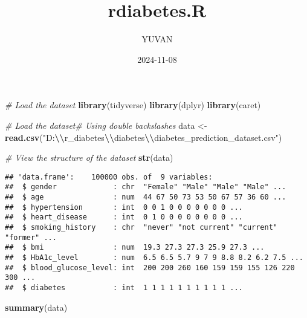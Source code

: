 \documentclass[
]{article}
\title{rdiabetes.R}
\author{YUVAN}
\date{2024-11-08}
\newenvironment{Shaded}{\begin{snugshade}}{\end{snugshade}}
\newcommand{\CommentTok}[1]{\textcolor[rgb]{0.56,0.35,0.01}{\textit{#1}}}
\newcommand{\FunctionTok}[1]{\textcolor[rgb]{0.13,0.29,0.53}{\textbf{#1}}}
\newcommand{\NormalTok}[1]{#1}
\newcommand{\OtherTok}[1]{\textcolor[rgb]{0.56,0.35,0.01}{#1}}
\newcommand{\SpecialCharTok}[1]{\textcolor[rgb]{0.81,0.36,0.00}{\textbf{#1}}}
\newcommand{\StringTok}[1]{\textcolor[rgb]{0.31,0.60,0.02}{#1}}
\begin{document}
\maketitle

\begin{Shaded}
\begin{Highlighting}[]
\CommentTok{\# Load the dataset}
\FunctionTok{library}\NormalTok{(tidyverse)}
\FunctionTok{library}\NormalTok{(dplyr)}
\FunctionTok{library}\NormalTok{(caret)}

\CommentTok{\# Load the dataset\# Using double backslashes}
\NormalTok{data }\OtherTok{\textless{}{-}} \FunctionTok{read.csv}\NormalTok{(}\StringTok{"D:}\SpecialCharTok{\textbackslash{}\textbackslash{}}\StringTok{r\_diabetes}\SpecialCharTok{\textbackslash{}\textbackslash{}}\StringTok{diabetes}\SpecialCharTok{\textbackslash{}\textbackslash{}}\StringTok{diabetes\_prediction\_dataset.csv"}\NormalTok{)}

\CommentTok{\# View the structure of the dataset}
\FunctionTok{str}\NormalTok{(data)}
\end{Highlighting}
\end{Shaded}

\begin{verbatim}
## 'data.frame':    100000 obs. of  9 variables:
##  $ gender             : chr  "Female" "Male" "Male" "Male" ...
##  $ age                : num  44 67 50 73 53 50 67 57 36 60 ...
##  $ hypertension       : int  0 0 1 0 0 0 0 0 0 0 ...
##  $ heart_disease      : int  0 1 0 0 0 0 0 0 0 0 ...
##  $ smoking_history    : chr  "never" "not current" "current" "former" ...
##  $ bmi                : num  19.3 27.3 27.3 25.9 27.3 ...
##  $ HbA1c_level        : num  6.5 6.5 5.7 9 7 9 8.8 8.2 6.2 7.5 ...
##  $ blood_glucose_level: int  200 200 260 160 159 159 155 126 220 300 ...
##  $ diabetes           : int  1 1 1 1 1 1 1 1 1 1 ...
\end{verbatim}

\begin{Shaded}
\begin{Highlighting}[]
\FunctionTok{summary}\NormalTok{(data)}
\end{Highlighting}
\end{Shaded}
\end{document}
